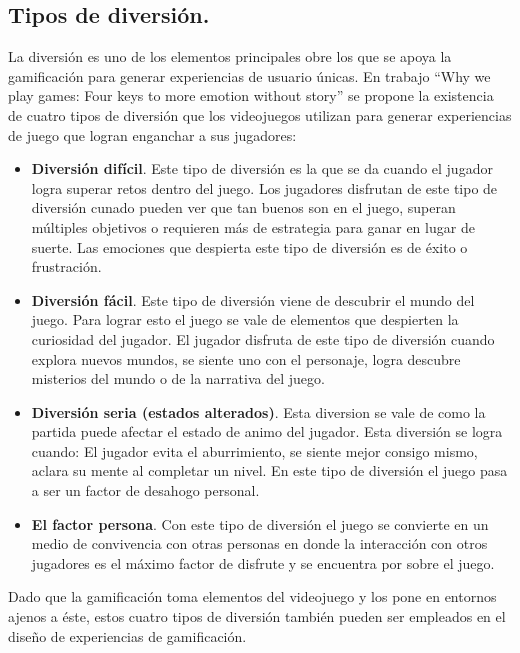 \subsection{Tipos de diversión.}
La diversión es uno de los elementos principales obre los que se apoya la 
gamificación para generar experiencias de usuario únicas. En trabajo “Why we 
play games: Four keys to more emotion without story” se propone la existencia 
de cuatro tipos de diversión que los videojuegos utilizan para generar 
experiencias de juego que logran enganchar a sus jugadores:

	\begin{itemize}
		\item \textbf{Diversión difícil}. Este tipo de diversión es la que se da 
		cuando el jugador logra superar retos dentro del juego. Los jugadores disfrutan 
		de este tipo de diversión cunado pueden ver que tan buenos son en el juego, 
		superan múltiples objetivos o requieren más de estrategia para ganar en lugar 
		de suerte. Las emociones que despierta este tipo de diversión es de éxito o 
		frustración\cite{RefDiversion}. 
	
		\item \textbf{Diversión fácil}. Este tipo de diversión viene de descubrir el 
		mundo del juego. Para lograr esto el juego se vale de elementos que despierten 
		la curiosidad del jugador. El jugador disfruta de este tipo de diversión cuando 
		explora nuevos mundos, se siente uno con el personaje, logra descubre misterios 
		del mundo o de la narrativa del juego\cite{RefDiversion}.  
	
		\item \textbf{Diversión seria (estados alterados)}. Esta diversion se vale de 
		como la partida puede afectar el estado de animo del jugador. Esta diversión se 
		logra cuando: El jugador evita el aburrimiento, se siente mejor consigo mismo, 
		aclara su mente al completar un nivel. En este tipo de diversión el juego pasa 
		a ser un factor de desahogo personal\cite{RefDiversion}.
	
	
		\item \textbf{El factor persona}. Con este tipo de diversión el juego se 
		convierte en un medio de convivencia con otras personas en donde la interacción 
		con otros jugadores es el máximo factor de disfrute y se encuentra por sobre 
		el juego\cite{RefDiversion}.
	\end{itemize} 

 Dado que la gamificación toma elementos del videojuego y los pone en entornos ajenos 
 a éste, estos cuatro tipos de diversión también pueden ser empleados en el diseño 
 de experiencias de gamificación. 


